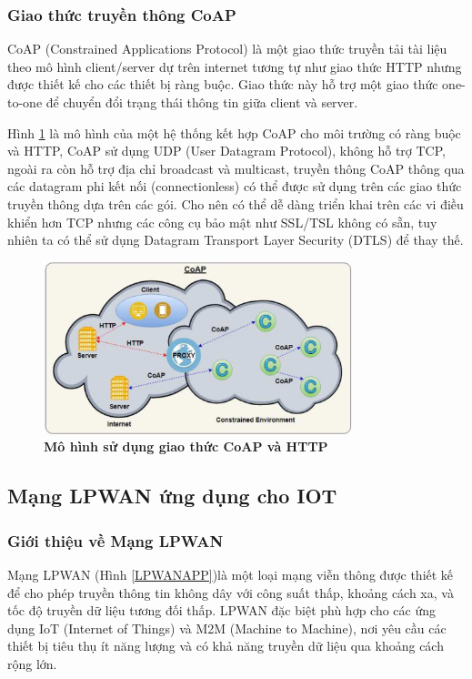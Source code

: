 \documentclass{article} %
\begin{document}
	\subsubsection{Giao thức truyền thông CoAP}
	
	CoAP (Constrained Applications Protocol) là một giao thức truyền tải tài liệu theo mô hình client/server dự trên internet tương tự như giao thức HTTP nhưng được thiết kế cho các thiết bị ràng buộc. Giao thức này hỗ trợ một giao thức one-to-one để chuyển đổi trạng thái thông tin giữa client và server.
	
	
	Hình \ref{HTTP} là mô hình của một hệ thống kết hợp CoAP cho môi trường có ràng buộc và HTTP, CoAP sử dụng UDP (User Datagram Protocol), không hỗ trợ TCP, ngoài ra còn hỗ trợ địa chỉ broadcast và multicast, truyền thông CoAP thông qua các datagram phi kết nối (connectionless) có thể được sử dụng trên các giao thức truyền thông dựa trên các gói. Cho nên có thể dễ dàng triển khai trên các vi điều khiển hơn TCP nhưng các công cụ bảo mật như SSL/TSL không có sẵn, tuy nhiên ta có thể sử dụng Datagram Transport Layer Security (DTLS) để thay thế.
	
	\begin{figure}[!ht]
		\centering
		\includegraphics[width=9cm,height=5cm]{Images/HTTP.png}
		\caption[Mô hình sử dụng giao thức CoAP và HTTP\cite{ansari2018internet}]{\bfseries \fontsize{12pt}{0pt}\selectfont Mô hình sử dụng giao thức CoAP và HTTP\cite{ansari2018internet}}
		\label{HTTP}
	\end{figure}
	
	
	\subsection{Mạng LPWAN ứng dụng cho IOT}
	\subsubsection{Giới thiệu về Mạng LPWAN}
	
	Mạng LPWAN (Hình \ref{LPWANAPP})là một loại mạng viễn thông được thiết kế để cho phép truyền thông tin không dây với công suất thấp, khoảng cách xa, và tốc độ truyền dữ liệu tương đối thấp. LPWAN đặc biệt phù hợp cho các ứng dụng IoT (Internet of Things) và M2M (Machine to Machine), nơi yêu cầu các thiết bị tiêu thụ ít năng lượng và có khả năng truyền dữ liệu qua khoảng cách rộng lớn.
	
\end{document}
